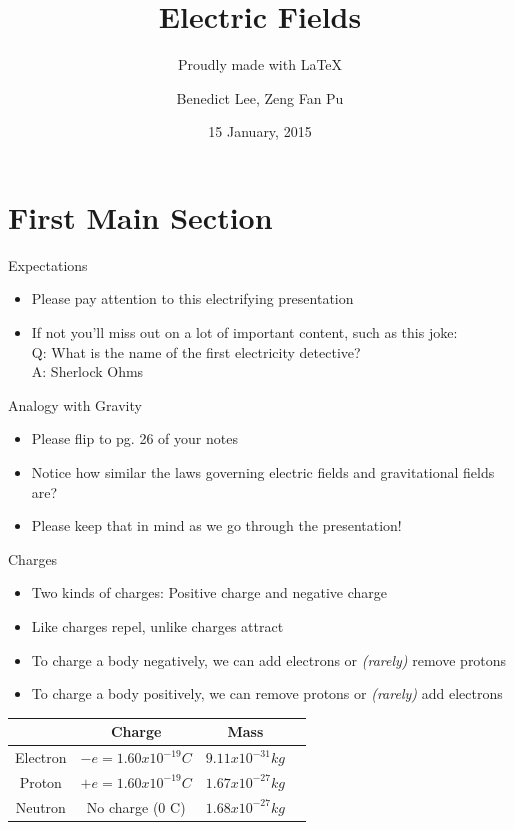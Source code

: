 \documentclass{beamer}
\title{Electric Fields}
\subtitle{Proudly made with \LaTeX}
\author{Benedict Lee, Zeng Fan Pu}
\institute[Hwa Chong Institution] %
\date{15 January, 2015}
\begin{document}
\begin{frame}
  \titlepage
\end{frame}

\section{First Main Section}

\begin{frame}{Expectations}{}
  \begin{itemize}
  \item Please pay attention to this electrifying presentation
  \item If not you'll miss out on a lot of important content, such as this	 joke:\\Q: What is the name of the first electricity detective?\\A: Sherlock Ohms 
  \end{itemize}
\end{frame}

\begin{frame}{Analogy with Gravity}{}
  \begin{itemize}
  \item Please flip to pg. 26 of your notes
  \item Notice how similar the laws governing electric fields and gravitational fields are?
  \item Please keep that in mind as we go through the presentation!
  \end{itemize}
\end{frame}

\begin{frame}{Charges}{}
  \begin{itemize}
  \item Two kinds of charges: Positive charge and negative charge
  \item Like charges repel, unlike charges attract 
  \item To charge a body negatively, we can add electrons or \textit{(rarely)} remove protons
  \item To charge a body positively, we can remove protons or \textit{(rarely)} add electrons
  \end{itemize}
  \begin{center}

    \label{table:second}
    \setlength{\tabcolsep}{2pt}
    \small
    \begin{tabular}{|c|c|c|c|} \hline
       & Charge & Mass \\ \hline
       Electron & \(-e  = 1.60 x 10^{-19} C \) & \(9.11 x 10^{-31} kg\) \\ \hline
       Proton & \( +e = 1.60 x 10^{-19} C \) & \(1.67 x 10^{-27} kg\) \\ \hline
       Neutron & No charge (0 C) & \(1.68 x 10^{-27} kg\) \\ \hline
    \end{tabular}
  \end{center}%
\end{frame}
\end{document}
